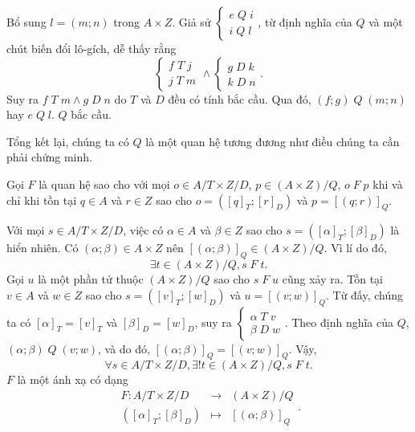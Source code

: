 Bổ sung $l = (m; n)$ trong $A \times Z$. Giả sử $\begin{cases}
   e\;Q\;i \\
   i\;Q\;l
\end{cases}$, từ định nghĩa của $Q$ và một chút biến đổi lô-gích, dễ thấy rằng \begin{equation*}
   \begin{cases}
      f\;T\;j \\
      j\;T\;m
   \end{cases} \land \begin{cases}
      g\;D\;k \\
      k\;D\;n
   \end{cases}.
\end{equation*} Suy ra $f\;T\;m \land g\;D\;n$ do $T$ và $D$ đều có tính bắc cầu. Qua đó, $(f; g)\;Q\;(m; n)$ hay $e\;Q\;l$. $Q$ bắc cầu.

Tổng kết lại, chúng ta có $Q$ là một quan hệ tương đương như điều chúng ta cần phải chứng minh.

\stepSubexercise Gọi $F$ là quan hệ sao cho với mọi $o \in A/T \times Z/D$, $p \in (A \times Z)/Q$, $o\;F\;p$ khi và chỉ khi tồn tại $q \in A$ và $r \in Z$ sao cho $o = \left([q]_T; [r]_D\right)$ và $p = [(q; r)]_Q$.

Với mọi $s \in A/T \times Z/D$, việc có $\alpha \in A$ và $\beta \in Z$ sao cho $s = \left([\alpha]_T; [\beta]_D\right)$ là hiển nhiên. Có $(\alpha; \beta) \in A \times Z$ nên $[(\alpha; \beta)]_Q \in (A \times Z)/Q$. Vì lí do đó,
\begin{equation*}
   \exists t \in (A \times Z)/Q, s\;F\;t. 
\end{equation*} 
Gọi $u$ là một phần tử thuộc $(A \times Z)/Q$ sao cho $s\;F\;u$ cũng xảy ra. Tồn tại $v \in A$ và $w \in Z$ sao cho $s = \left([v]_T; [w]_D\right)$ và $u = [(v; w)]_Q$. Từ đấy, chúng ta có $[\alpha]_T = [v]_T$ và $[\beta]_D = [w]_D$, suy ra $\begin{cases}
   \alpha\;T\;v \\
   \beta\;D\;w
\end{cases}$. Theo định nghĩa của $Q$, $(\alpha; \beta)\;Q\;(v; w)$, và do đó, $[(\alpha; \beta)]_Q = [(v; w)]_Q$. Vậy, \begin{equation*}
   \forall s \in A/T \times Z/D, \exists ! t \in (A \times Z)/Q, s\;F\;t.
\end{equation*}
$F$ là một ánh xạ có dạng $$\begin{array}{rcl}
   F: A/T \times Z/D & \to & (A \times Z)/Q \\
      ([\alpha]_T; [\beta]_D) & \mapsto & [(\alpha; \beta)]_Q
\end{array}.$$ 

